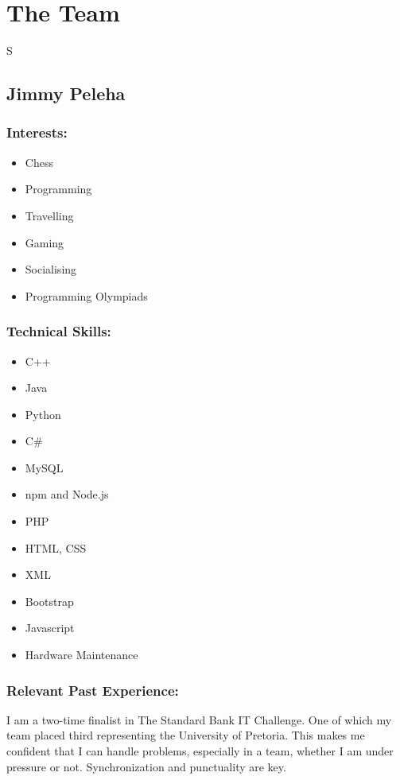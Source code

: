 \section{The Team}

S\subsection{Jimmy Peleha}

\subsubsection{Interests:}
\begin{itemize}
	\item Chess
	\item Programming
	\item Travelling
	\item Gaming
	\item Socialising
	\item Programming Olympiads
\end{itemize}

\subsubsection{Technical Skills:}
\begin{itemize}
	\item C++
	\item Java
	\item Python
	\item C\#
	\item MySQL
	\item npm and Node.js
	\item PHP
	\item HTML, CSS
	\item XML
	\item Bootstrap
	\item Javascript
	\item Hardware Maintenance 
\end{itemize}


\subsubsection{Relevant Past Experience:}
\par{I am a two-time finalist in The Standard Bank IT Challenge. One of which my team placed third representing the University of Pretoria. This makes me confident that I can handle problems, especially in a team, whether I am under pressure or not. Synchronization and punctuality are key.}

